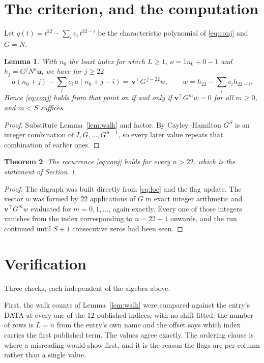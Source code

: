 \documentclass[11pt,a4paper]{article}
\theoremstyle{plain}
\newtheorem{theorem}{Theorem}
\newtheorem{lemma}[theorem]{Lemma}
\theoremstyle{definition}
\begin{document}
\section{The criterion, and the computation}

Let $q(t)=t^{22}-\sum_i c_i\,t^{22-i}$ be the characteristic polynomial of
\eqref{eq:conj} and $G=N$.

\begin{lemma}\label{lem:crit}
With $n_0$ the least index for which $L\ge1$, $o=1n_0+0-1$ and
$h_j=G^{j}N^{o}\mathbf{u}$, we have for $j\ge22$
\[
a(n_0+j)-\sum_i c_i\,a(n_0+j-i)=\,\mathbf{v}^{\!\top}G^{\,j-22}w,
\qquad w=h_{22}-\sum_i c_ih_{22-i} .
\]
Hence \eqref{eq:conj} holds from that point on if and only if
$\mathbf{v}^{\!\top}G^{m}w=0$ for all $m\ge0$, and $m<S$ suffices.
\end{lemma}

\begin{proof}
Substitute Lemma~\ref{lem:walk} and factor. By Cayley--Hamilton $G^{S}$ is an integer
combination of $I,G,\dots,G^{S-1}$, so every later value repeats that combination of earlier
ones.
\end{proof}

\begin{theorem}
The recurrence \eqref{eq:conj} holds for every $n>22$, which is the statement of
Section~1.
\end{theorem}

\begin{proof}
The digraph was built directly from \eqref{eq:loc} and the flag update. The vector $w$ was
formed by $22$ applications of $G$ in exact integer arithmetic and
$\mathbf{v}^{\!\top}G^{m}w$ evaluated for $m=0,1,\dots$, again exactly. Every one of
those integers vanishes from the index corresponding to $n=22+1$ onwards, and the run
continued until $S+1$ consecutive zeros had been seen.
\end{proof}

\section{Verification}

Three checks, each independent of the algebra above.

First, the walk counts of Lemma~\ref{lem:walk} were compared against the entry's DATA at
every one of the $12$ published indices, with no shift fitted: the number of rows is
$L=n$ from the entry's own name and the offset says which index carries the first
published term. The values agree exactly. The ordering clause is where a misreading would
show first, and it is the reason the flags are per column rather than a single value.
\end{document}
